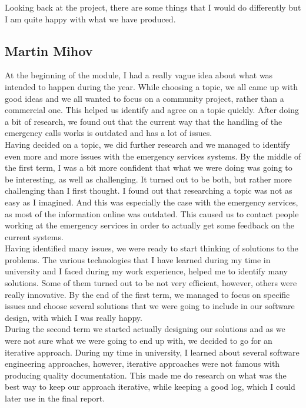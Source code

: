 \documentclass[]{article}
\begin{document}
Looking back at the project, there are some things that I would do differently but I am quite happy with what we have produced.

    \pagebreak
    \subsection{Martin Mihov}
    At the beginning of the module, I had a really vague idea about what was intended to happen during the year. While choosing a topic, we all came up with good ideas and we all wanted to focus on a community project, rather than a commercial one. This helped us identify and agree on a topic quickly. After doing a bit of research, we found out that the current way that the handling of the emergency calls works is outdated and has a lot of issues.\\

Having decided on a topic, we did further research and we managed to identify even more and more issues with the emergency services systems. By the middle of the first term, I was a bit more confident that what we were doing was going to be interesting, as well as challenging. It turned out to be both, but rather more challenging than I first thought. I found out that researching a topic was not as easy as I imagined. And this was especially the case with the emergency services, as most of the information online was outdated. This caused us to contact people working at the emergency services in order to actually get some feedback on the current systems.\\

Having identified many issues, we were ready to start thinking of solutions to the problems. The various technologies that I have learned during my time in university and I faced during my work experience, helped me to identify many solutions. Some of them turned out to be not very efficient, however, others were really innovative. By the end of the first term, we managed to focus on specific issues and choose several solutions that we were going to include in our software design, with which I was really happy.\\

During the second term we started actually designing our solutions and as we were not sure what we were going to end up with, we decided to go for an iterative approach. During my time in university, I learned about several software engineering approaches, however, iterative approaches were not famous with producing quality documentation. This made me do research on what was the best way to keep our approach iterative, while keeping a good log, which I could later use in the final report.\\
\end{document}
